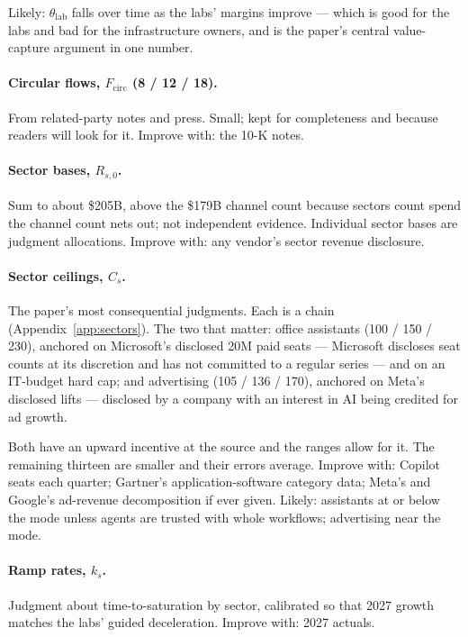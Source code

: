 \documentclass[11pt,letterpaper]{article}
\begin{document}
Likely: $\theta_{\text{lab}}$ falls over time as the labs' margins improve --- which is good for the labs and bad for the infrastructure owners, and is the paper's central value-capture argument in one number.

\paragraph{Circular flows, $F_{\text{circ}}$ (8 / 12 / 18).} From related-party notes and press. Small; kept for completeness and because readers will look for it. Improve with: the 10-K notes.

\paragraph{Sector bases, $R_{s,0}$.} Sum to about \$205B, above the \$179B channel count because sectors count spend the channel count nets out; not independent evidence. Individual sector bases are judgment allocations. Improve with: any vendor's sector revenue disclosure.

\paragraph{Sector ceilings, $C_s$.} The paper's most consequential judgments. Each is a chain (Appendix~\ref{app:sectors}). The two that matter: office assistants (100 / 150 / 230), anchored on Microsoft's disclosed 20M paid seats --- Microsoft discloses seat counts at its discretion and has not committed to a regular series --- and on an IT-budget hard cap; and advertising (105 / 136 / 170), anchored on Meta's disclosed lifts --- disclosed by a company with an interest in AI being credited for ad growth.

Both have an upward incentive at the source and the ranges allow for it. The remaining thirteen are smaller and their errors average. Improve with: Copilot seats each quarter; Gartner's application-software category data; Meta's and Google's ad-revenue decomposition if ever given. Likely: assistants at or below the mode unless agents are trusted with whole workflows; advertising near the mode.

\paragraph{Ramp rates, $k_s$.} Judgment about time-to-saturation by sector, calibrated so that 2027 growth matches the labs' guided deceleration. Improve with: 2027 actuals.
\end{document}
